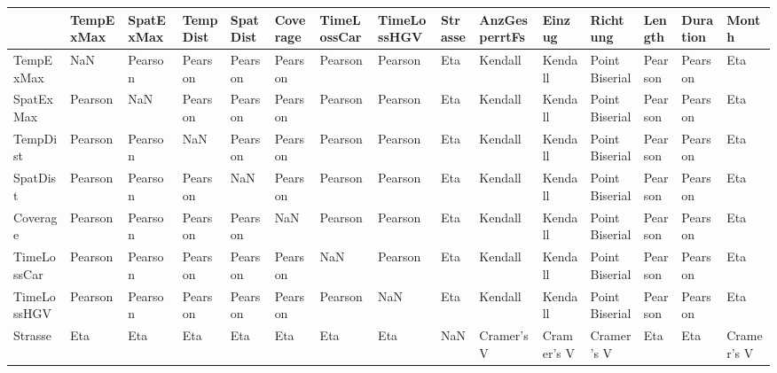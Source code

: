\begin{tabular}{lllllllllllllll}
\toprule
{} &       TempExMax &       SpatExMax &        TempDist &        SpatDist &        Coverage &     TimeLossCar &     TimeLossHGV &     Strasse & AnzGesperrtFs &      Einzug &        Richtung &          Length &        Duration &       Month \\
\midrule
TempExMax     &             NaN &         Pearson &         Pearson &         Pearson &         Pearson &         Pearson &         Pearson &         Eta &       Kendall &     Kendall &  Point Biserial &         Pearson &         Pearson &         Eta \\
SpatExMax     &         Pearson &             NaN &         Pearson &         Pearson &         Pearson &         Pearson &         Pearson &         Eta &       Kendall &     Kendall &  Point Biserial &         Pearson &         Pearson &         Eta \\
TempDist      &         Pearson &         Pearson &             NaN &         Pearson &         Pearson &         Pearson &         Pearson &         Eta &       Kendall &     Kendall &  Point Biserial &         Pearson &         Pearson &         Eta \\
SpatDist      &         Pearson &         Pearson &         Pearson &             NaN &         Pearson &         Pearson &         Pearson &         Eta &       Kendall &     Kendall &  Point Biserial &         Pearson &         Pearson &         Eta \\
Coverage      &         Pearson &         Pearson &         Pearson &         Pearson &             NaN &         Pearson &         Pearson &         Eta &       Kendall &     Kendall &  Point Biserial &         Pearson &         Pearson &         Eta \\
TimeLossCar   &         Pearson &         Pearson &         Pearson &         Pearson &         Pearson &             NaN &         Pearson &         Eta &       Kendall &     Kendall &  Point Biserial &         Pearson &         Pearson &         Eta \\
TimeLossHGV   &         Pearson &         Pearson &         Pearson &         Pearson &         Pearson &         Pearson &             NaN &         Eta &       Kendall &     Kendall &  Point Biserial &         Pearson &         Pearson &         Eta \\
Strasse       &             Eta &             Eta &             Eta &             Eta &             Eta &             Eta &             Eta &         NaN &    Cramer's V &  Cramer's V &      Cramer's V &             Eta &             Eta &  Cramer's V \\

\end{tabular}
